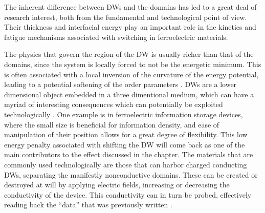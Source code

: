The inherent difference between DWs and the domains has led to a great deal of research interest, both from the fundamental and technological point of view.
Their thickness and interfacial energy play an important role in the kinetics and fatigue mechanisms associated with switching in ferroelectric materials. 

The physics that govern the region of the DW is usually richer than that of the domains, since the system is locally forced to not be the energetic minimum.
This is often associated with a local inversion of the curvature of the energy potential, leading to a potential softening of the order parameters \cite{Scott2012}.
DWs are a lower dimensional object embedded in a three dimentional medium, which can have a myriad of interesting consequences which can potentially be exploited technologically \cite{Salje2016}.
One example is in ferroelectric information storage devices, where the small size is beneficial for information density, and ease of manipulation of their position allows for a great degree of flexibility.
This low energy penalty associated with shifting the DW will come back as one of the main contributors to the effect discussed in the chapter.
The materials that are commonly used technologically are those that can harbor charged conducting DWs, separating the manifestly nonconductive domains.
These can be created or destroyed at will by applying electric fields, increasing or decreasing the conductivity of the device.
This conductivity can in turn be probed, effectively reading back the ``data'' that was previously written .


